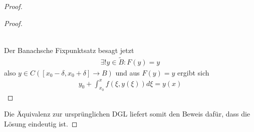 \begin{theorem}
\begin{proof}
\begin{enum-arab}
\begin{proof}
\begin{enum-alph}
\begin{align*}
          \end{align*}
        \end{enum-alph}
        Der Banachsche Fixpunktsatz besagt jetzt
        \begin{align*}
          \exists! y \in \tilde B : F(y) = y
        \end{align*}
        also $y \in C([x_0-\delta, x_0+\delta] \to B)$ und aus $F(y) = y$ ergibt sich
        \begin{align*}
          y_0  + \int_{x_0}^x f(\xi, y(\xi)) d \xi = y(x)
        \end{align*}
      \end{proof}
    \end{enum-arab}
    Die Äquivalenz zur ursprünglichen DGL liefert somit den Beweis dafür, dass die Lösung eindeutig ist.
  \end{proof}
\end{theorem}



